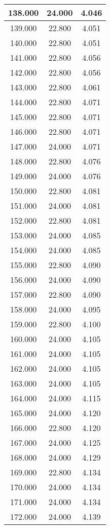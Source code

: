 \begin{longtable}[c]{|c|c|c|}
138.000	&24.000&4.046  \\ \hline 	
139.000	&22.800&4.051  \\ \hline 	
140.000	&22.800&4.051  \\ \hline 	
141.000	&22.800&4.056  \\ \hline 	
142.000	&22.800&4.056  \\ \hline 	
143.000	&22.800&4.061  \\ \hline 	
144.000	&22.800&4.071  \\ \hline 	
145.000	&22.800&4.071  \\ \hline 	
146.000	&22.800&4.071  \\ \hline 	
147.000	&24.000&4.071  \\ \hline 	
148.000	&22.800&4.076  \\ \hline 	
149.000	&24.000&4.076  \\ \hline 	
150.000	&22.800&4.081  \\ \hline 	
151.000	&24.000&4.081  \\ \hline 	
152.000	&22.800&4.081  \\ \hline 	
153.000	&24.000&4.085  \\ \hline 	
154.000	&24.000&4.085  \\ \hline 	
155.000	&22.800&4.090  \\ \hline 	
156.000	&24.000&4.090  \\ \hline 	
157.000	&22.800&4.090  \\ \hline 	
158.000	&24.000&4.095  \\ \hline 	
159.000	&22.800&4.100  \\ \hline 	
160.000	&24.000&4.105  \\ \hline 	
161.000	&24.000&4.105  \\ \hline 	
162.000	&24.000&4.105  \\ \hline 	
163.000	&24.000&4.105  \\ \hline 	
164.000	&24.000&4.115  \\ \hline 	
165.000	&24.000&4.120  \\ \hline 	
166.000	&22.800&4.120  \\ \hline 	
167.000	&24.000&4.125  \\ \hline 	
168.000	&24.000&4.129  \\ \hline 	
169.000	&22.800&4.134  \\ \hline 	
170.000	&24.000&4.134  \\ \hline 	
171.000	&24.000&4.134  \\ \hline 	
172.000	&24.000&4.139  \\ \hline 	

\end{longtable}
